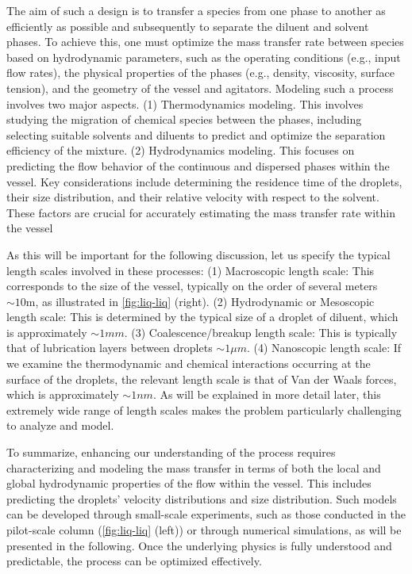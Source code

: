 The aim of such a design is to transfer a species from one phase to another as efficiently as possible and subsequently to separate the diluent and solvent phases.
To achieve this, one must optimize the mass transfer rate between species based on hydrodynamic parameters, such as the operating conditions (e.g., input flow rates), the physical properties of the phases (e.g., density, viscosity, surface tension), and the geometry of the vessel and agitators.
Modeling such a process involves two major aspects.
(1) Thermodynamics modeling. This involves studying the migration of chemical species between the phases, including selecting suitable solvents and diluents to predict and optimize the separation efficiency of the mixture.
(2) Hydrodynamics modeling. This focuses on predicting the flow behavior of the continuous and dispersed phases within the vessel. Key considerations include determining the residence time of the droplets, their size distribution, and their relative velocity with respect to the solvent. These factors are crucial for accurately estimating the mass transfer rate within the vessel



As this will be important for the following discussion, let us specify the typical length scales involved in these processes:
(1) Macroscopic length scale: This corresponds to the size of the vessel, typically on the order of several meters $\sim 10 \text{m}$, as illustrated in \ref{fig:liq-liq} (right). 
(2) Hydrodynamic or Mesoscopic length scale: This is determined by the typical size of a droplet of diluent, which is approximately $\sim 1 mm$. 
(3) Coalescence/breakup length scale: This is typically that of lubrication layers between droplets $\sim 1 \mu m$. 
(4) Nanoscopic length scale: If we examine the thermodynamic and chemical interactions occurring at the surface of the droplets, the relevant length scale is that of Van der Waals forces, which is approximately $\sim 1 nm$. 
As will be explained in more detail later, this extremely wide range of length scales makes the problem particularly challenging to analyze and model. 

To summarize, enhancing our understanding of the process requires characterizing and modeling the mass transfer in terms of both the local and global hydrodynamic properties of the flow within the vessel. 
This includes predicting the droplets' velocity distributions and size distribution. 
Such models can be developed through small-scale experiments, such as those conducted in the pilot-scale column (\ref{fig:liq-liq} (left)) or through numerical simulations, as will be presented in the following. 
Once the underlying physics is fully understood and predictable, the process can be optimized effectively.


